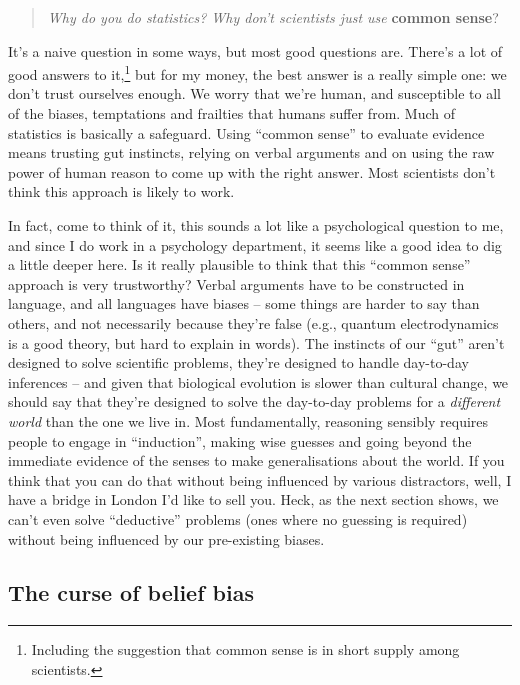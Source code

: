 \documentclass[
  a4paper,
]{book}
\begin{document}
\begin{quote}
\emph{Why do you do statistics? Why don't scientists just use}
\textbf{common sense}?
\end{quote}

It's a naive question in some ways, but most good questions are. There's
a lot of good answers to it,\footnote{Including the suggestion that
  common sense is in short supply among scientists.} but for my money,
the best answer is a really simple one: we don't trust ourselves enough.
We worry that we're human, and susceptible to all of the biases,
temptations and frailties that humans suffer from. Much of statistics is
basically a safeguard. Using ``common sense'' to evaluate evidence means
trusting gut instincts, relying on verbal arguments and on using the raw
power of human reason to come up with the right answer. Most scientists
don't think this approach is likely to work.

In fact, come to think of it, this sounds a lot like a psychological
question to me, and since I do work in a psychology department, it seems
like a good idea to dig a little deeper here. Is it really plausible to
think that this ``common sense'' approach is very trustworthy? Verbal
arguments have to be constructed in language, and all languages have
biases -- some things are harder to say than others, and not necessarily
because they're false (e.g., quantum electrodynamics is a good theory,
but hard to explain in words). The instincts of our ``gut'' aren't
designed to solve scientific problems, they're designed to handle
day-to-day inferences -- and given that biological evolution is slower
than cultural change, we should say that they're designed to solve the
day-to-day problems for a \emph{different world} than the one we live
in. Most fundamentally, reasoning sensibly requires people to engage in
``induction'', making wise guesses and going beyond the immediate
evidence of the senses to make generalisations about the world. If you
think that you can do that without being influenced by various
distractors, well, I have a bridge in London I'd like to sell you. Heck,
as the next section shows, we can't even solve ``deductive'' problems
(ones where no guessing is required) without being influenced by our
pre-existing biases.

\hypertarget{the-curse-of-belief-bias}{%
\subsection{The curse of belief bias}\label{the-curse-of-belief-bias}}
\end{document}
